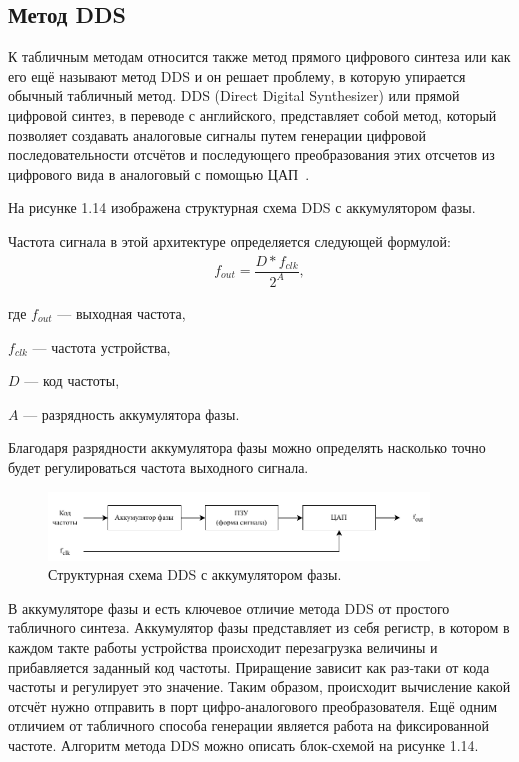 \subsection{Метод DDS}	

	К табличным методам относится также метод прямого цифрового синтеза или как его ещё называют метод DDS и он решает проблему, в которую упирается обычный табличный метод. %
	DDS (Direct Digital Synthesizer) или прямой цифровой синтез, в переводе с английского, представляет собой метод, который позволяет создавать аналоговые сигналы путем генерации цифровой последовательности отсчётов и последующего преобразования этих отсчетов из цифрового вида в аналоговый с помощью ЦАП~\cite{leso}.
	
	На рисунке 1.14 изображена структурная схема DDS с аккумулятором фазы.
	
	Частота сигнала в этой архитектуре определяется следующей формулой:
	\begin{gather}
	f_{out}=\dfrac{D * f_{clk}}{2^{A}},
	\end{gather}
		
	где $f_{out}$ --- выходная частота, 
	
	$f_{clk}$ --- частота устройства, 
	
	$D$ --- код частоты, 
	
	$A$ --- разрядность аккумулятора фазы.
	
	Благодаря разрядности аккумулятора фазы можно определять насколько точно будет регулироваться частота выходного сигнала.
	
	\begin{figure}[H]
    \centering
    \includegraphics[width=0.9\textwidth]{../image/dds_func.pdf}
    \caption{Структурная схема DDS с аккумулятором фазы.}
	\end{figure}
	
	В аккумуляторе фазы и есть ключевое отличие метода DDS от простого табличного синтеза. Аккумулятор фазы представляет из себя регистр, в котором в каждом такте работы устройства происходит перезагрузка величины и прибавляется заданный код частоты. Приращение зависит как раз-таки от кода частоты и регулирует это значение. Таким образом, происходит вычисление какой отсчёт нужно отправить в порт цифро-аналогового преобразователя. Ещё одним отличием от табличного способа генерации является работа на фиксированной частоте. Алгоритм метода DDS можно описать блок-схемой на рисунке 1.14.
	
